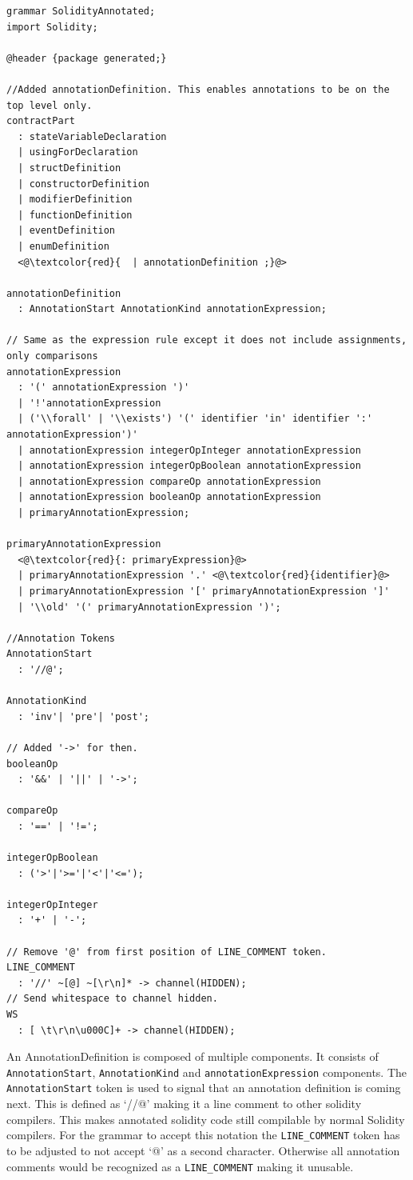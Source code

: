 \documentclass[a4paper]{article}
\begin{document}
\begin{lstlisting}[basicstyle=\ttfamily, breaklines=true]
grammar SolidityAnnotated;
import Solidity;

@header {package generated;}

//Added annotationDefinition. This enables annotations to be on the top level only.
contractPart
  : stateVariableDeclaration
  | usingForDeclaration
  | structDefinition
  | constructorDefinition
  | modifierDefinition
  | functionDefinition
  | eventDefinition
  | enumDefinition 
  <@\textcolor{red}{  | annotationDefinition ;}@>

annotationDefinition
  : AnnotationStart AnnotationKind annotationExpression;

// Same as the expression rule except it does not include assignments, only comparisons
annotationExpression
  : '(' annotationExpression ')'
  | '!'annotationExpression
  | ('\\forall' | '\\exists') '(' identifier 'in' identifier ':' annotationExpression')'
  | annotationExpression integerOpInteger annotationExpression
  | annotationExpression integerOpBoolean annotationExpression
  | annotationExpression compareOp annotationExpression
  | annotationExpression booleanOp annotationExpression
  | primaryAnnotationExpression;

primaryAnnotationExpression
  <@\textcolor{red}{: primaryExpression}@> 
  | primaryAnnotationExpression '.' <@\textcolor{red}{identifier}@> 
  | primaryAnnotationExpression '[' primaryAnnotationExpression ']'
  | '\\old' '(' primaryAnnotationExpression ')';

//Annotation Tokens
AnnotationStart
  : '//@';

AnnotationKind
  : 'inv'| 'pre'| 'post';

// Added '->' for then.
booleanOp
  : '&&' | '||' | '->';

compareOp
  : '==' | '!=';

integerOpBoolean
  : ('>'|'>='|'<'|'<=');

integerOpInteger
  : '+' | '-';

// Remove '@' from first position of LINE_COMMENT token. 
LINE_COMMENT 
  : '//' ~[@] ~[\r\n]* -> channel(HIDDEN);
// Send whitespace to channel hidden.
WS
  : [ \t\r\n\u000C]+ -> channel(HIDDEN);
\end{lstlisting}
An AnnotationDefinition is composed of multiple components. It consists of \texttt{AnnotationStart}, \texttt{AnnotationKind} and \texttt{annotationExpression} components. The \texttt{AnnotationStart} token is used to signal that an annotation definition is coming next. This is defined as `//@' making it a line comment to other solidity compilers. This makes annotated solidity code still compilable by normal Solidity compilers. For the grammar to accept this notation the \texttt{LINE\_COMMENT} token has to be adjusted to not accept `@' as a second character. Otherwise all annotation comments would be recognized as a \texttt{LINE\_COMMENT} making it unusable. \par
\end{document}
